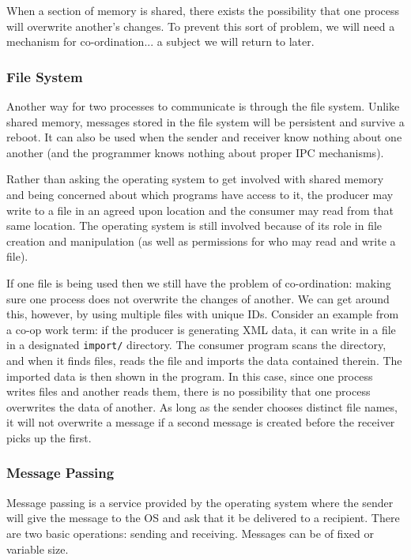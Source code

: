 When a section of memory is shared, there exists the possibility that one process will overwrite another's changes. To prevent this sort of problem, we will need a mechanism for co-ordination... a subject we will return to later.

\subsubsection*{File System}

Another way for two processes to communicate is through the file system. Unlike shared memory, messages stored in the file system will be persistent and survive a reboot. It can also be used when the sender and receiver know nothing about one another (and the programmer knows nothing about proper IPC mechanisms).

Rather than asking the operating system to get involved with shared memory and being concerned about which programs have access to it, the producer may write to a file in an agreed upon location and the consumer may read from that same location. The operating system is still involved because of its role in file creation and manipulation (as well as permissions for who may read and write a file).

If one file is being used then we still have the problem of co-ordination: making sure one process does not overwrite the changes of another. We can get around this, however, by using multiple files with unique IDs. Consider an example from a co-op work term: if the producer is generating XML data, it can write in a file in a designated \texttt{import/} directory. The consumer program scans the directory, and when it finds files, reads the file and imports the data contained therein. The imported data is then shown in the program. In this case, since one process writes files and another reads them, there is no possibility that one process overwrites the data of another. As long as the sender chooses distinct file names, it will not overwrite a message if a second message is created before the receiver picks up the first.

\subsubsection*{Message Passing}

Message passing is a service provided by the operating system where the sender will give the message to the OS and ask that it be delivered to a recipient. There are two basic operations: sending and receiving. Messages can be of fixed or variable size.

